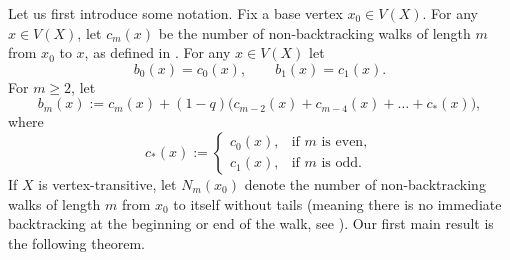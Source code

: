 \documentclass[reqno,10pt]{amsart}
\theoremstyle{definition}
\numberwithin{equation}{section}
\begin{document}
Let us first introduce some notation. 
Fix a base vertex $x_0\in V(X)$. For any $x \in V(X)$, let $c_m(x)$ be the number of non-backtracking walks of length $m$ from $x_0$ to $x$, as defined in \cite[Section~2.1]{CHJSV}. For any $x\in V(X)$ let
\begin{equation*}\label{eq:def-bm01}
    b_0(x)=c_0(x),\qquad b_1(x)=c_1(x).
\end{equation*}
For $m\geq 2$, let
\begin{equation}\label{eq:def-bm}
    b_m(x) := c_m(x)+(1-q)\big(c_{m-2}(x)+c_{m-4}(x)+\dots+c_{*}(x)\big),
\end{equation}
where
\begin{equation}\label{eq:def-cstar}
    c_{*}(x) :=
    \begin{cases}
        c_0(x), & \text{if $m$ is even}, \\
        c_1(x), & \text{if $m$ is odd}.
    \end{cases}
\end{equation}
If $X$ is vertex-transitive, let $N_m(x_0)$ denote the number of non-backtracking walks of length $m$ from $x_0$ to itself without tails (meaning there is no immediate backtracking at the beginning or end of the walk, see \cite[Section~2.1]{CHJSV}). Our first main result is the following theorem.
\end{document}
